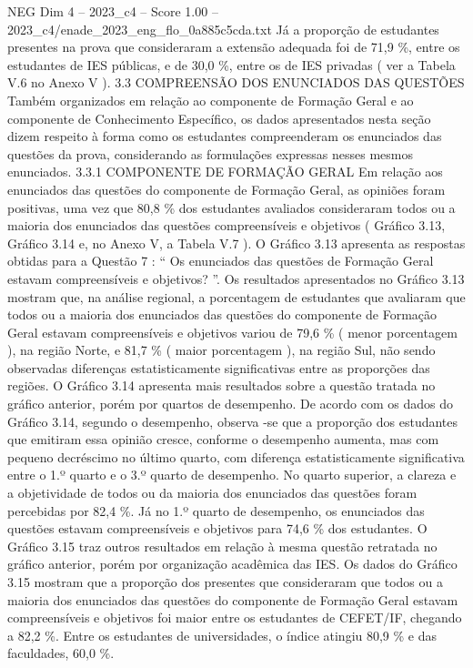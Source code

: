 \begin{textsample}{NEG Dim 4 – 2023\_c4 – Score 1.00 – 2023\_c4/enade\_2023\_eng\_flo\_0a885c5cda.txt}
Já a proporção de estudantes presentes na prova que consideraram a extensão adequada foi de 71,9 \%, entre os estudantes de IES públicas, e de 30,0 \%, entre os de IES privadas ( ver a Tabela V.6 no Anexo V ). 3.3 COMPREENSÃO DOS ENUNCIADOS DAS QUESTÕES Também organizados em relação ao componente de Formação Geral e ao componente de Conhecimento Específico, os dados apresentados nesta seção dizem respeito à forma como os estudantes compreenderam os enunciados das questões da prova, considerando as formulações expressas nesses mesmos enunciados. 3.3.1 COMPONENTE DE FORMAÇÃO GERAL Em relação aos enunciados das questões do componente de Formação Geral, as opiniões foram positivas, uma vez que 80,8 \% dos estudantes avaliados consideraram todos ou a maioria dos enunciados das questões compreensíveis e objetivos ( Gráfico 3.13, Gráfico 3.14 e, no Anexo V, a Tabela V.7 ).
O Gráfico 3.13 apresenta as respostas obtidas para a Questão 7 : “ Os enunciados das questões de Formação Geral estavam compreensíveis e objetivos? ”.
Os resultados apresentados no Gráfico 3.13 mostram que, na análise regional, a porcentagem de estudantes que avaliaram que todos ou a maioria dos enunciados das questões do componente de Formação Geral estavam compreensíveis e objetivos variou de 79,6 \% ( menor porcentagem ), na região Norte, e 81,7 \% ( maior porcentagem ), na região Sul, não sendo observadas diferenças estatisticamente significativas entre as proporções das regiões.
O Gráfico 3.14 apresenta mais resultados sobre a questão tratada no gráfico anterior, porém por quartos de desempenho.
De acordo com os dados do Gráfico 3.14, segundo o desempenho, observa -se que a proporção dos estudantes que emitiram essa opinião cresce, conforme o desempenho aumenta, mas com pequeno decréscimo no último quarto, com diferença estatisticamente significativa entre o 1.º quarto e o 3.º quarto de desempenho.
No quarto superior, a clareza e a objetividade de todos ou da maioria dos enunciados das questões foram percebidas por 82,4 \%.
Já no 1.º quarto de desempenho, os enunciados das questões estavam compreensíveis e objetivos para 74,6 \% dos estudantes.
O Gráfico 3.15 traz outros resultados em relação à mesma questão retratada no gráfico anterior, porém por organização acadêmica das IES.
Os dados do Gráfico 3.15 mostram que a proporção dos presentes que consideraram que todos ou a maioria dos enunciados das questões do componente de Formação Geral estavam compreensíveis e objetivos foi maior entre os estudantes de CEFET/IF, chegando a 82,2 \%.
Entre os estudantes de universidades, o índice atingiu 80,9 \% e das faculdades, 60,0 \%.

\end{textsample}
